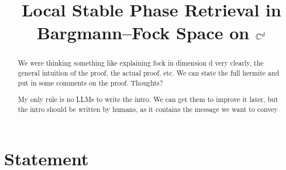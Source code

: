 \documentclass[11pt]{amsart}
\title{Local Stable Phase Retrieval in Bargmann--Fock Space on $\mathbb{C}^d$}
\author{}
\theoremstyle{remark}
\begin{document}
\begin{abstract}
We were thinking something like explaining fock in dimension d very clearly, the general intuition of the proof, the actual proof, etc. We can state the full hermite and put in some comments on the proof. Thoughts?

My only rule is no LLMs to write the intro. We can get them to improve it later, but the intro should be written by humans, as it contains the message we want to convey
\end{abstract}

\maketitle
 
\section{Statement}
\end{document}

